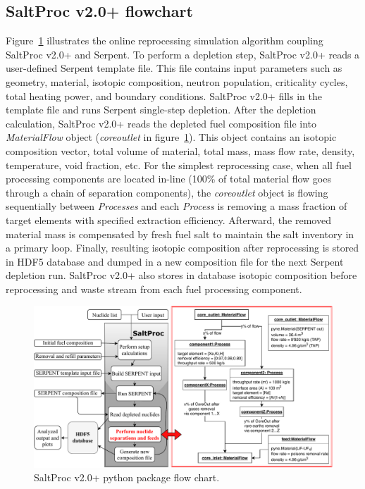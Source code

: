 \documentclass[12pt]{article} %
\begin{document}
\subsection{SaltProc v2.0+ flowchart}
Figure~\ref{fig:saltproc_flow} illustrates the online reprocessing simulation 
algorithm coupling SaltProc v2.0+ and Serpent. To perform a depletion step, 
SaltProc v2.0+ reads a user-defined Serpent template file. This file contains input 
 parameters such as geometry, material, isotopic composition, neutron 
population, criticality cycles, total heating power, and boundary conditions. 
SaltProc v2.0+ fills in the template file and runs Serpent single-step depletion. 
After the depletion calculation, SaltProc v2.0+ reads the depleted fuel composition 
file into \textit{MaterialFlow} object (\textit{core\textunderscore outlet} in 
figure~\ref{fig:saltproc_flow}). This object contains an isotopic composition 
vector, total volume of material, total mass, mass flow rate, density, temperature, 
void fraction, etc. For the simplest reprocessing case, when all fuel 
processing components are located in-line 
(100\% of total material flow goes through 
a chain of separation components), the \textit{core\textunderscore outlet} object is flowing 
sequentially between \textit{Processes} and each \textit{Process} is 
removing a mass fraction of target elements with specified extraction 
efficiency. Afterward, the removed material mass is compensated by 
fresh fuel salt to maintain the salt inventory in a primary loop. 
Finally, resulting isotopic composition after reprocessing is stored in 
HDF5 database and dumped in a new composition file for the next 
Serpent depletion run. SaltProc v2.0+ also stores in database isotopic composition 
before reprocessing and waste stream from each fuel processing component. 
\begin{figure}[ht!] %
	\centering
  \includegraphics[width=1.03\textwidth]{saltproc_flowchart.pdf}
  	  	\vspace{-0.35in}
  \caption{SaltProc v2.0+ python package flow chart.}
  \label{fig:saltproc_flow}
\end{figure}
\end{document}
